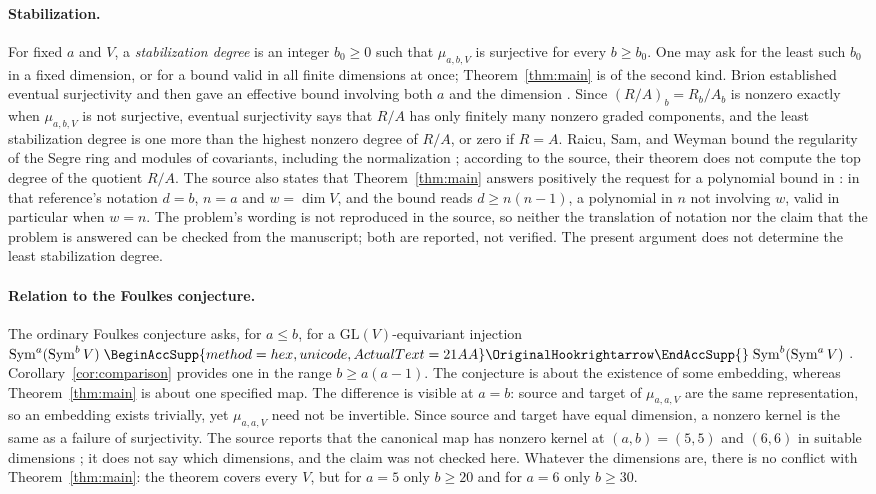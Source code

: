 \documentclass[11pt]{article}
\renewcommand{\hookrightarrow}{\mathrel{
  \BeginAccSupp{method=hex,unicode,ActualText=21AA}
  \OriginalHookrightarrow\EndAccSupp{}}}
\theoremstyle{remark}
\DeclareMathOperator{\Sym}{Sym}
\begin{document}
\paragraph{Stabilization.}
For fixed $a$ and $V$, a \emph{stabilization degree} is an integer
$b_0\ge0$ such that $\mu_{a,b,V}$ is surjective for every $b\ge b_0$. One
may ask for the least such $b_0$ in a fixed dimension, or for a bound valid
in all finite dimensions at once; Theorem~\ref{thm:main} is of the second
kind. Brion established eventual surjectivity \cite{Brion1993} and then
gave an effective bound involving both $a$ and the dimension
\cite[Theorem~3.3]{Brion}. Since $(R/A)_b=R_b/A_b$ is nonzero exactly when
$\mu_{a,b,V}$ is not surjective, eventual surjectivity says that $R/A$ has
only finitely many nonzero graded components, and the least stabilization
degree is one more than the highest nonzero degree of $R/A$, or zero if
$R=A$. Raicu, Sam, and Weyman bound the regularity of the Segre ring and
modules of covariants, including the normalization
\cite[Theorem~3.9]{RSW}; according to the source, their theorem does not
compute the top degree of the quotient $R/A$. The source also states that
Theorem~\ref{thm:main} answers positively the request for a polynomial
bound in \cite[Problem~7.19]{Landsberg}: in that reference's notation
$d=b$, $n=a$ and $w=\dim V$, and the bound reads $d\ge n(n-1)$, a
polynomial in $n$ not involving $w$, valid in particular when $w=n$. The
problem's wording is not reproduced in the source, so neither the
translation of notation nor the claim that the problem is answered can be
checked from the manuscript; both are reported, not verified. The present
argument does not determine the least stabilization degree.

\paragraph{Relation to the Foulkes conjecture.}
The ordinary Foulkes conjecture \cite{Foulkes1950} asks, for $a\le b$, for
a $\mathrm{GL}(V)$-equivariant injection
$\Sym^a(\Sym^b V)\hookrightarrow\Sym^b(\Sym^a V)$
\cite[Conjecture~2.10]{RSW}. Corollary~\ref{cor:comparison} provides one in
the range $b\ge a(a-1)$. The conjecture is about the existence of some
embedding, whereas Theorem~\ref{thm:main} is about one specified map. The
difference is visible at $a=b$: source and target of $\mu_{a,a,V}$ are the
same representation, so an embedding exists trivially, yet $\mu_{a,a,V}$
need not be invertible. Since source and target have equal dimension, a
nonzero kernel is the same as a failure of surjectivity. The source reports
that the canonical map has nonzero kernel at $(a,b)=(5,5)$ and $(6,6)$ in
suitable dimensions
\cite[arXiv version, Theorem~6(b),(c) and Remark~7]{CIM}; it does not say
which dimensions, and the claim was not checked here. Whatever the
dimensions are, there is no conflict with Theorem~\ref{thm:main}: the
theorem covers every $V$, but for $a=5$ only $b\ge20$ and for $a=6$ only
$b\ge30$.
\end{document}
